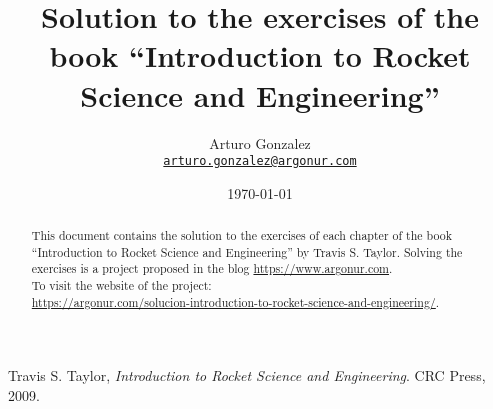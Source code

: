 \documentclass{article}
\begin{document}
\title{Solution to the exercises of the book ``Introduction to Rocket Science and Engineering''}
\author{Arturo Gonzalez\\
	\texttt{\href{mailto:arturo.gonzalez@argonur.com}{arturo.gonzalez@argonur.com}}}
\date{\today}
\maketitle

\begin{abstract}
This document contains the solution to the exercises of each chapter of the book ``Introduction to Rocket Science and Engineering'' by Travis S. Taylor. Solving the exercises is a project proposed in the blog \url{https://www.argonur.com}.\\
To visit the website of the project: \\
\url{https://argonur.com/solucion-introduction-to-rocket-science-and-engineering/}. 
\end{abstract}



\begin{thebibliography}{99}

	Travis S. Taylor,
	\emph{Introduction to Rocket Science and Engineering}.
	CRC Press,
	2009.
	
\end{thebibliography}
\end{document}
